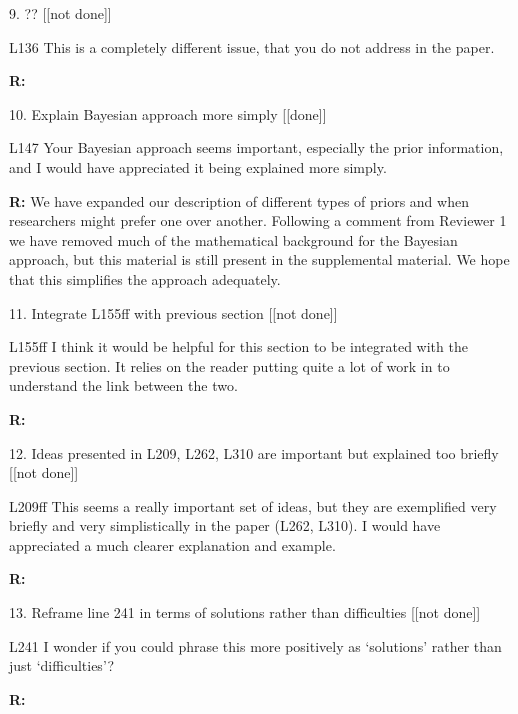\documentclass[12pt]{letter}
\newenvironment{refquote}{\bigskip \begin{it}}{\end{it}\smallskip}
\begin{document}
	9. ?? [[not done]]

		\begin{refquote}
		L136 This is a completely different issue, that you do not address in the paper.
		\end{refquote}

		\textbf{R:}


	10. Explain Bayesian approach more simply [[done]]

		\begin{refquote}
		L147 Your Bayesian approach seems important, especially the prior information, and I would have appreciated it being explained more simply.
		\end{refquote}

		\textbf{R:} We have expanded our description of different types of priors and when researchers might prefer one over another. Following a comment from Reviewer 1 we have removed much of the mathematical background for the Bayesian approach, but this material is still present in the supplemental material. We hope that this simplifies the approach adequately.


	11. Integrate L155ff with previous section [[not done]]

		\begin{refquote}
		L155ff I think it would be helpful for this section to be integrated with the previous section. It relies on the reader putting quite a lot of work in to understand the link between the two.
		\end{refquote}

		\textbf{R:}


	12. Ideas presented in L209, L262, L310 are important but explained too briefly [[not done]]

		\begin{refquote}
		L209ff This seems a really important set of ideas, but they are exemplified very briefly and very simplistically in the paper (L262, L310). I would have appreciated a much clearer explanation and example.
		\end{refquote}

		\textbf{R:}


	13. Reframe line 241 in terms of solutions rather than difficulties [[not done]]

		\begin{refquote}
		L241 I wonder if you could phrase this more positively as ‘solutions’ rather than just ‘difficulties’?
		\end{refquote}

		\textbf{R:}
\end{document}
